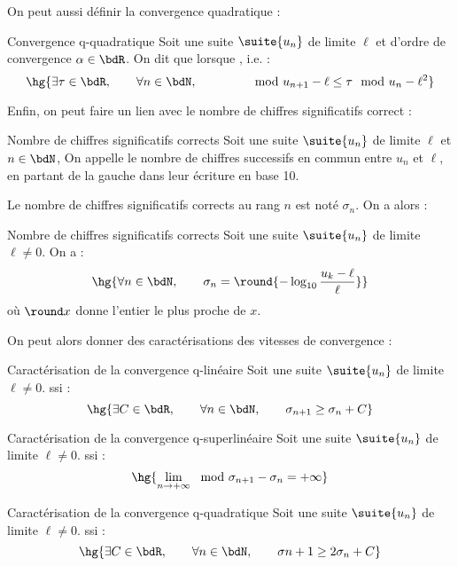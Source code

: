 \documentclass[a4paper,french,bookmarks]{article}
\begin{document}
On peut aussi définir la convergence quadratique :

\begin{definition}{Convergence q-quadratique}{}
    Soit une suite $\suite{u_n}$ de limite $\ell$ et d'ordre de convergence $\alpha \in \bdR$. On dit que  lorsque , i.e. :
    \[ \hg{\exists \tau \in \bdR,\qquad \forall n \in \bdN,\qquad \qquad \mod{u_{n+1} - \ell} \leq \tau\mod{u_n - \ell}^2}\]
\end{definition}

Enfin, on peut faire un lien avec le nombre de chiffres significatifs correct :
%
\begin{definition}{Nombre de chiffres significatifs corrects}{}
    Soit une suite $\suite{u_n}$ de limite $\ell$ et $n \in \bdN$, On appelle  le nombre de chiffres successifs en commun entre $u_n$ et $\ell$, en partant de la gauche dans leur écriture en base 10.
\end{definition}

Le nombre de chiffres significatifs corrects au rang $n$ est noté $\sigma_n$. On a alors :

\begin{property}{Nombre de chiffres significatifs corrects}{}
    Soit une suite $\suite{u_n}$ de limite $\ell \neq 0$. On a :
    \[ \hg{\forall n \in \bdN,\qquad \sigma_n = \round{-\log_{10} \dfrac{u_k - \ell}{\ell}}}\]
    où $\round x$ donne l'entier le plus proche de $x$.
\end{property}

On peut alors donner des caractérisations des vitesses de convergence :

\begin{property}{Caractérisation de la convergence q-linéaire}{}
    Soit une suite $\suite{u_n}$ de limite $\ell \neq 0$.  ssi :
    \[ \hg{\exists C \in \bdR,\qquad \forall n \in \bdN,\qquad \sigma_{n+1} \geq \sigma_n + C}\]
\end{property}

\begin{property}{Caractérisation de la convergence q-superlinéaire}{}
    Soit une suite $\suite{u_n}$ de limite $\ell \neq 0$.  ssi :
    \[ \hg{\lim\limits_{n \to +\infty} \mod{\sigma_{n+1} - \sigma_n} = +\infty}\]
\end{property}

\begin{property}{Caractérisation de la convergence q-quadratique}{}
    Soit une suite $\suite{u_n}$ de limite $\ell \neq 0$.  ssi :
    \[ \hg{\exists C \in \bdR,\qquad \forall n \in \bdN,\qquad \sigma{n+1} \geq 2\sigma_n + C}\]
\end{property}
\end{document}
